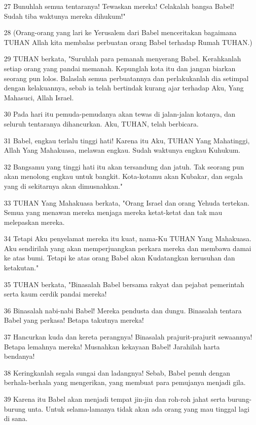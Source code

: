 \par 27 Bunuhlah semua tentaranya! Tewaskan mereka! Celakalah bangsa Babel! Sudah tiba waktunya mereka dihukum!"
\par 28 (Orang-orang yang lari ke Yerusalem dari Babel menceritakan bagaimana TUHAN Allah kita membalas perbuatan orang Babel terhadap Rumah TUHAN.)
\par 29 TUHAN berkata, "Suruhlah para pemanah menyerang Babel. Kerahkanlah setiap orang yang pandai memanah. Kepunglah kota itu dan jangan biarkan seorang pun lolos. Balaslah semua perbuatannya dan perlakukanlah dia setimpal dengan kelakuannya, sebab ia telah bertindak kurang ajar terhadap Aku, Yang Mahasuci, Allah Israel.
\par 30 Pada hari itu pemuda-pemudanya akan tewas di jalan-jalan kotanya, dan seluruh tentaranya dihancurkan. Aku, TUHAN, telah berbicara.
\par 31 Babel, engkau terlalu tinggi hati! Karena itu Aku, TUHAN Yang Mahatinggi, Allah Yang Mahakuasa, melawan engkau. Sudah waktunya engkau Kuhukum.
\par 32 Bangsamu yang tinggi hati itu akan tersandung dan jatuh. Tak seorang pun akan menolong engkau untuk bangkit. Kota-kotamu akan Kubakar, dan segala yang di sekitarnya akan dimusnahkan."
\par 33 TUHAN Yang Mahakuasa berkata, "Orang Israel dan orang Yehuda tertekan. Semua yang menawan mereka menjaga mereka ketat-ketat dan tak mau melepaskan mereka.
\par 34 Tetapi Aku penyelamat mereka itu kuat, nama-Ku TUHAN Yang Mahakuasa. Aku sendirilah yang akan memperjuangkan perkara mereka dan membawa damai ke atas bumi. Tetapi ke atas orang Babel akan Kudatangkan kerusuhan dan ketakutan."
\par 35 TUHAN berkata, "Binasalah Babel bersama rakyat dan pejabat pemerintah serta kaum cerdik pandai mereka!
\par 36 Binasalah nabi-nabi Babel! Mereka pendusta dan dungu. Binasalah tentara Babel yang perkasa! Betapa takutnya mereka!
\par 37 Hancurkan kuda dan kereta perangnya! Binasalah prajurit-prajurit sewaannya! Betapa lemahnya mereka! Musnahkan kekayaan Babel! Jarahilah harta bendanya!
\par 38 Keringkanlah segala sungai dan ladangnya! Sebab, Babel penuh dengan berhala-berhala yang mengerikan, yang membuat para pemujanya menjadi gila.
\par 39 Karena itu Babel akan menjadi tempat jin-jin dan roh-roh jahat serta burung-burung unta. Untuk selama-lamanya tidak akan ada orang yang mau tinggal lagi di sana.
